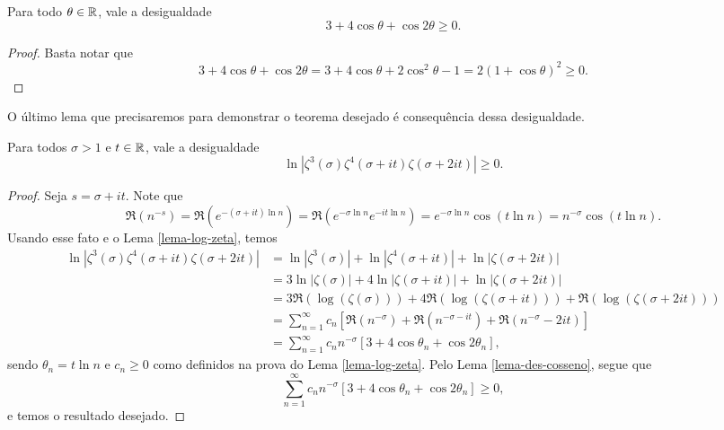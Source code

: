     \begin{lema}
    \label{lema-des-cosseno}
        Para todo $\theta\in\mathbb{R}$, vale a desigualdade
        \[
        3 + 4\cos\theta + \cos 2\theta \geq 0.
        \]
    \end{lema}
    \begin{proof}
        Basta notar que
        \[
        3 + 4\cos\theta + \cos 2\theta 
        = 3 + 4\cos\theta + 2\cos^2\theta - 1
        = 2(1 + \cos\theta)^2 \geq 0.
        \]
    \end{proof}
    O último lema que precisaremos para demonstrar o 
    teorema desejado é consequência dessa desigualdade.
    \begin{lema}
    \label{lema-log-produto-zetas}
        Para todos $\sigma>1$ e $t\in\mathbb{R}$, vale a desigualdade
        \[
        \ln|\zeta^3(\sigma)\zeta^4(\sigma + it)\zeta(\sigma + 2it)|
        \geq 0.
        \]
    \end{lema}
    \begin{proof}
        Seja $s = \sigma + it$. Note que
        \[
        \Re(n^{-s})
        = \Re(e^{-(\sigma + it)\ln n})
        = \Re(e^{-\sigma\ln n}e^{-it\ln n})
        = e^{-\sigma\ln n}\cos(t\ln n)
        = n^{-\sigma}\cos(t\ln n).
        \]
        Usando esse fato e o Lema \ref{lema-log-zeta}, temos
        \begin{align*}
            \ln|\zeta^3(\sigma)\zeta^4(\sigma + it)\zeta(\sigma + 2it)|
            &= \ln|\zeta^3(\sigma)| + \ln|\zeta^4(\sigma + it)|
                                    + \ln|\zeta(\sigma + 2it)| \\
            &= 3\ln|\zeta(\sigma)| + 4\ln|\zeta(\sigma + it)| 
                                   + \ln|\zeta(\sigma + 2it)| \\
            &= 3\Re(\log(\zeta(\sigma))) + 4\Re(\log(\zeta(\sigma + it)))
                                         + \Re(\log(\zeta(\sigma + 2it))) \\
            &= \sum_{n=1}^{\infty} c_n \left[\Re(n^{-\sigma}) 
                                        + \Re(n^{-\sigma - it})
                                        + \Re(n^{-\sigma} - 2it) \right] \\
            &= \sum_{n=1}^{\infty} c_n n^{-\sigma}\left[3 + 4\cos\theta_n
                                                        + \cos 2\theta_n \right],
        \end{align*}
        sendo $\theta_n = t\ln n$ e $c_n\geq 0$ como definidos na prova
        do Lema \ref{lema-log-zeta}. Pelo Lema \ref{lema-des-cosseno}, segue que
        \[
        \sum_{n=1}^{\infty} c_n n^{-\sigma}\left[3 + 4\cos\theta_n
                                                        + \cos 2\theta_n \right]
        \geq 0,
        \]
        e temos o resultado desejado.
    \end{proof}
    
